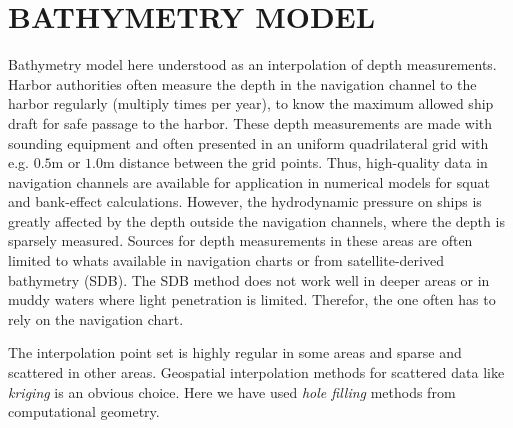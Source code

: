 \documentclass[A4paper,11pt]{marine_2023_Paper}
\begin{document}
\section{BATHYMETRY MODEL}
Bathymetry model here understood as an interpolation of depth measurements. Harbor authorities often measure the depth in the navigation channel to the harbor regularly (multiply times per year), to know the maximum allowed ship draft for safe passage to the harbor. These depth measurements are made with sounding equipment and often presented in an uniform quadrilateral grid with e.g. $0.5$m or $1.0$m distance between the grid points. Thus, high-quality data in navigation channels are available for application in numerical models for squat and bank-effect calculations. However, the hydrodynamic pressure on ships is greatly affected by the depth outside the navigation channels, where the depth is sparsely measured. Sources for depth measurements in these areas are often limited to whats available in navigation charts or from satellite-derived bathymetry (SDB). The SDB method does not work well in deeper areas or in muddy waters where light penetration is limited. Therefor, the one often has to rely on the navigation chart. 

The interpolation point set is highly regular in some areas and sparse and scattered in other areas. Geospatial interpolation methods for scattered data like \emph{kriging} is an obvious choice. Here we have used \emph{hole filling} methods from computational geometry. 
\end{document}
